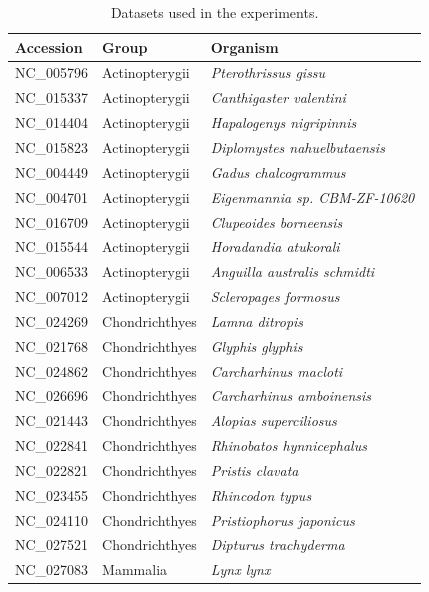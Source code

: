 \documentclass[extendedabs]{recpad2k}
\begin{document}
\begin{table}
   \caption{Datasets used in the experiments.}
   \label{tab.dataset}
   \centering
   \vspace{3mm}
   \begin{tabular}{lll}
      \hline
      Accession & Group & Organism \\
      \hline
      NC\_005796 & Actinopterygii & \textit{Pterothrissus gissu} \\
      NC\_015337 & Actinopterygii & \textit{Canthigaster valentini} \\
      NC\_014404 & Actinopterygii & \textit{Hapalogenys nigripinnis} \\
      NC\_015823 & Actinopterygii & \textit{Diplomystes nahuelbutaensis} \\
      NC\_004449 & Actinopterygii & \textit{Gadus chalcogrammus} \\
      NC\_004701 & Actinopterygii & \textit{Eigenmannia sp. CBM-ZF-10620} \\
      NC\_016709 & Actinopterygii & \textit{Clupeoides borneensis} \\
      NC\_015544 & Actinopterygii & \textit{Horadandia atukorali} \\
      NC\_006533 & Actinopterygii & \textit{Anguilla australis schmidti} \\
      NC\_007012 & Actinopterygii & \textit{Scleropages formosus} \\
      NC\_024269 & Chondrichthyes & \textit{Lamna ditropis} \\
      NC\_021768 & Chondrichthyes & \textit{Glyphis glyphis} \\
      NC\_024862 & Chondrichthyes & \textit{Carcharhinus macloti} \\
      NC\_026696 & Chondrichthyes & \textit{Carcharhinus amboinensis} \\
      NC\_021443 & Chondrichthyes & \textit{Alopias superciliosus} \\
      NC\_022841 & Chondrichthyes & \textit{Rhinobatos hynnicephalus} \\
      NC\_022821 & Chondrichthyes & \textit{Pristis clavata} \\
      NC\_023455 & Chondrichthyes & \textit{Rhincodon typus} \\
      NC\_024110 & Chondrichthyes & \textit{Pristiophorus japonicus} \\
      NC\_027521 & Chondrichthyes & \textit{Dipturus trachyderma} \\
      NC\_027083 & Mammalia & \textit{Lynx lynx} \\

\end{tabular}
\end{table}
\end{document}
